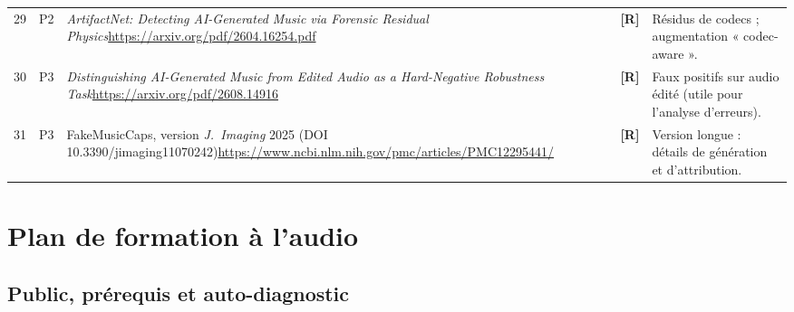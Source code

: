 \documentclass[11pt,a4paper]{article}
\newcommand{\sR}{\textbf{[R]}}
\begin{document}
{\begin{longtable}{L{0.6cm}L{0.8cm}L{6.1cm}L{1.0cm}L{5.0cm}}
29 & P2 & \emph{ArtifactNet: Detecting AI-Generated Music via Forensic Residual Physics}\newline \url{https://arxiv.org/pdf/2604.16254.pdf} & \sR & Résidus de codecs ; augmentation « codec-aware ».\\
30 & P3 & \emph{Distinguishing AI-Generated Music from Edited Audio as a Hard-Negative Robustness Task}\newline \url{https://arxiv.org/pdf/2608.14916} & \sR & Faux positifs sur audio édité (utile pour l'analyse d'erreurs).\\
31 & P3 & FakeMusicCaps, version \emph{J.~Imaging} 2025 (DOI 10.3390/jimaging11070242)\newline \url{https://www.ncbi.nlm.nih.gov/pmc/articles/PMC12295441/} & \sR & Version longue : détails de génération et d'attribution.\\
\end{longtable}
}

\section{Plan de formation à l'audio}
\label{app:formation}

\subsection{Public, prérequis et auto-diagnostic}
\end{document}
